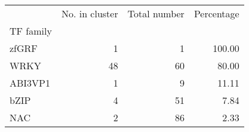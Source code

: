 \begin{tabular}{lrrr}
\toprule
{} &  No. in cluster &  Total number &  Percentage \\
TF family &                 &               &             \\
\midrule
zfGRF     &               1 &             1 &      100.00 \\
WRKY      &              48 &            60 &       80.00 \\
ABI3VP1   &               1 &             9 &       11.11 \\
bZIP      &               4 &            51 &        7.84 \\
NAC       &               2 &            86 &        2.33 \\
\bottomrule
\end{tabular}
